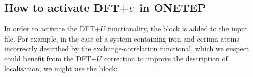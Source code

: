 \documentclass[letterpaper,10pt,english]{sphinxmanual}
\begin{document}
\subsection{How to activate DFT+\protect\(U\protect\) in ONETEP}
\label{\detokenize{ONETEP_DFT+U_README:how-to-activate-dft-in-onetep}}
In order to activate the DFT+\(U\) functionality, the 
block is added to the input file. For example, in the case of a system
containing iron and cerium atoms incorrectly described by the
exchange-correlation functional, which we suspect could benefit from the
DFT+\(U\) correction to improve the description of localisation,
we might use the  block:

%
\begin{sphinxVerbatim}[commandchars=\\\{\}]
  
                   
                  
                   
  
\end{sphinxVerbatim}
\end{document}
